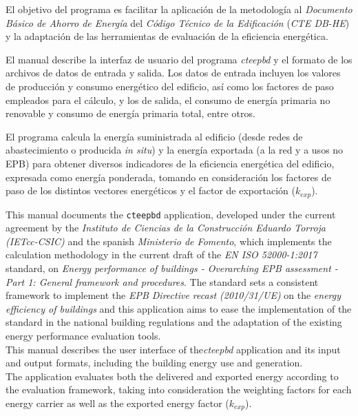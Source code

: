 \documentclass[10pt,notitlepage,oneside,a4paper]{article}
\begin{document}
El objetivo del programa es facilitar la aplicación de la metodología al \textit{Documento Básico de Ahorro de Energía} del \textit{Código Técnico de la Edificación} (\textit{CTE DB-HE}) y la adaptación de las herramientas de evaluación de la eficiencia energética.

El manual describe la interfaz de usuario del programa \textit{cteepbd} y el formato de los archivos de datos de entrada y salida. Los datos de entrada incluyen los valores de producción y consumo energético del edificio, así como los factores de paso empleados para el cálculo, y los de salida, el consumo de energía primaria no renovable y consumo de energía primaria total, entre otros.

El programa calcula la energía suministrada al edificio (desde redes de abastecimiento o producida \textit{in situ}) y la energía exportada (a la red y a usos no EPB) para obtener diversos indicadores de la eficiencia energética del edificio, expresada como energía ponderada, tomando en consideración los factores de paso de los distintos vectores energéticos y el factor de exportación ($k_{exp}$).

\begin{myquote}\footnotesize
This manual documents the \texttt{cteepbd} application, developed under the current agreement by the \textit{Instituto de Ciencias de la Construcción Eduardo Torroja (IETcc-CSIC)} and the spanish \textit{Ministerio de Fomento}, which implements the calculation methodology in the current draft of the \textit{EN ISO 52000-1:2017} standard, on \textit{Energy performance of buildings - Overarching EPB assessment - Part 1: General framework and procedures}. The standard sets a consistent framework to implement the \textit{EPB Directive recast (2010/31/UE)} on the \textit{energy efficiency of buildings} and this application aims to ease the implementation of the standard in the national building regulations and the adaptation of the existing energy performance evaluation tools.
\\

This manual describes the user interface of the\textit{cteepbd} application and its input and output formats, including the building energy use and generation.
\\

The application evaluates both the delivered and exported energy according to the evaluation framework, taking into consideration the weighting factors for each energy carrier as well as the exported energy factor ($k_{exp}$).
\end{myquote}
\end{document}

